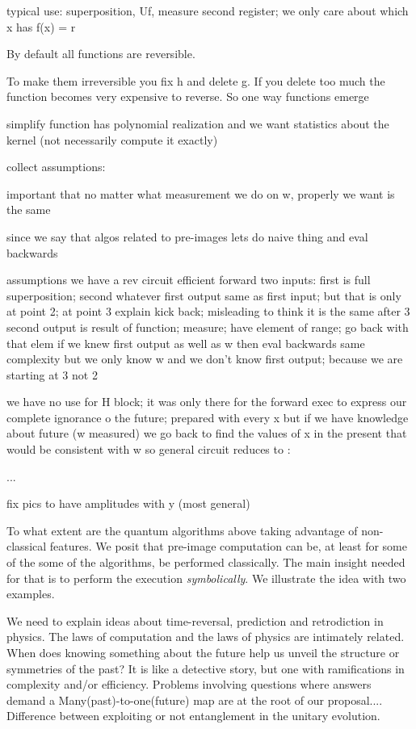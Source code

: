 \documentclass{article}
\begin{document}
typical use: superposition, Uf, measure second register; we only care
about which x has f(x) = r

By default all functions are reversible. 

To make them irreversible you fix h and delete g. If you delete too
much the function becomes very expensive to reverse. So one way
functions emerge


simplify function has polynomial realization and we want
statistics about the kernel (not necessarily compute it exactly)



collect assumptions:


important that no matter what measurement we do on w, properly we want is the same


since we say that algos related to pre-images lets do naive thing and eval backwards

assumptions we have a rev circuit efficient forward
two inputs: first is full superposition; second whatever
first output same as first input; but that is only at point 2; at point 3 explain kick back; misleading to think it is the same after 3
second output is result of function; measure; have element of range; go back with that elem
if we knew first output as well as w then eval backwards same complexity but we only know w and we don't know first output; because we are starting at 3 not 2

we have no use for H block; it was only there for the forward exec to express our complete ignorance o the future; prepared with every x but if we have knowledge about future (w measured) we go back to find the values of x in the present that would be consistent with w so general circuit reduces to :

...

fix pics to have amplitudes with y (most general)

To what extent are the quantum algorithms above taking advantage of
non-classical features. We posit that pre-image computation can be, at
least for some of the some of the algorithms, be performed
classically. The main insight needed for that is to perform the
execution \emph{symbolically}. We illustrate the idea with two
examples.

We need to explain ideas about time-reversal, prediction and retrodiction in 
physics. The laws of computation and the laws of physics are intimately related. 
When does knowing something about the future help us unveil the structure or 
symmetries of the past? It is like a detective story, but one with 
ramifications in complexity and/or efficiency. Problems involving questions 
where answers demand a Many(past)-to-one(future) map are at the root of 
our proposal.... {\color{red} Difference between exploiting or not entanglement
in the unitary evolution.}
\end{document}
